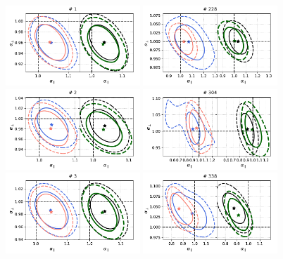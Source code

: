 \begin{figure}
    \centering
    \includegraphics[width=0.45\textwidth]{fig/galaxies/gaussian_contours0.pdf}  
    \includegraphics[width=0.45\textwidth]{fig/galaxies/non_gaussian_contours1.pdf}  
    \includegraphics[width=0.45\textwidth]{fig/galaxies/gaussian_contours1.pdf}  
    \includegraphics[width=0.45\textwidth]{fig/galaxies/non_gaussian_contours2.pdf}  
    \includegraphics[width=0.45\textwidth]{fig/galaxies/gaussian_contours2.pdf}  
    \includegraphics[width=0.45\textwidth]{fig/galaxies/non_gaussian_contours3.pdf}  

\end{figure}
